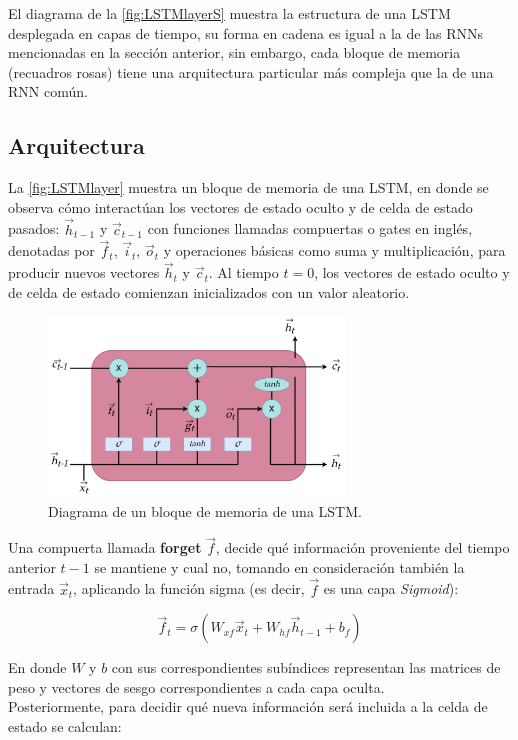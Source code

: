 El diagrama de la \autoref{fig:LSTMlayerS} muestra la estructura de una \acs{LSTM} desplegada en capas de tiempo, su forma en cadena es igual a la de las \acs{RNN}s mencionadas en la sección anterior, sin embargo, cada bloque de memoria (recuadros rosas) tiene una arquitectura particular más compleja que la de una \acs{RNN} común.

\subsection{Arquitectura}\label{sec:LSTM_Arch}
La \autoref{fig:LSTMlayer} muestra un bloque de memoria de una \acs{LSTM}, en donde se observa cómo interactúan los vectores de estado oculto y de celda de estado pasados: $\vec{h}_{t-1}$ y $\vec{c}_{t-1}$ con funciones llamadas compuertas o gates en inglés, denotadas por $\vec{f}_t$, $\vec{i}_t$, $\vec{o}_t$ y operaciones básicas como suma y multiplicación, para producir nuevos vectores $\vec{h}_{t}$ y $\vec{c}_{t}$. Al tiempo $t=0$, los vectores de estado oculto y de celda de estado comienzan inicializados con un valor aleatorio. \cite{Olah}

\begin{figure}[!htbp]
  \centering
  \includegraphics[width=0.7\textwidth]{./img/LSTM_layer.png}
  \caption{Diagrama de un bloque de memoria de una \acs{LSTM}.}
  \label{fig:LSTMlayer}
\end{figure}

Una compuerta llamada \textbf{forget} $\vec{f}$, decide qué información proveniente del tiempo anterior $t-1$ se mantiene y cual no, tomando en consideración también la entrada $\vec{x}_t$, aplicando la función sigma (es decir, $\vec{f}$ es una capa \emph{Sigmoid}):

\begin{equation}\label{eq:ft}
\vec{f}_t = \sigma(W_{xf}\vec{x}_t + W_{hf}\vec{h}_{t-1} + b_f)
\end{equation}

En donde $W$ y $b$ con sus correspondientes subíndices representan las matrices de peso y vectores de sesgo correspondientes a cada capa oculta. \\
Posteriormente, para decidir qué nueva información será incluida a la celda de estado se calculan:

